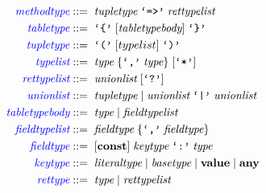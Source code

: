 \begin{align*}
\textcolor{blue}{\textit{methodtype}} & ::= \; \textit{tupletype} \; \texttt{`=>'} \; \textit{rettypelist}\\
\textcolor{blue}{\textit{tabletype}} & ::= \; \texttt{`\{'} \; [\textit{tabletypebody}] \; \texttt{`\}'}\\
\textcolor{blue}{\textit{tupletype}} & ::= \; \texttt{`('} \; [typelist] \; \texttt{`)'}\\
\textcolor{blue}{\textit{typelist}} & ::= \; \textit{type} \; \{\texttt{`,'} \; \textit{type}\} \; [\texttt{`*'}]\\
\textcolor{blue}{\textit{rettypelist}} & ::= \; \textit{unionlist} \; [\texttt{`?'}]\\
\textcolor{blue}{\textit{unionlist}} & ::= \; \textit{tupletype} \; | \;
  \textit{unionlist} \; \texttt{`|'} \; \textit{unionlist}\\
\textcolor{blue}{\textit{tabletypebody}} & ::= \; \textit{type} \; | \; \textit{fieldtypelist}\\
\textcolor{blue}{\textit{fieldtypelist}} & ::= \; \textit{fieldtype} \; \{\texttt{`,'} \; \textit{fieldtype}\}\\ 
\textcolor{blue}{\textit{fieldtype}} & ::= \; [\textbf{const}] \; \textit{keytype} \; \texttt{`:'} \; \textit{type}\\
\textcolor{blue}{\textit{keytype}} & ::= \; \textit{literaltype} \; | \;
  \textit{basetype} \; | \;
  \textbf{value} \; | \;
  \textbf{any}\\
\textcolor{blue}{\textit{rettype}} & ::= \; \textit{type} \; | \; \textit{rettypelist}\\
\end{align*}
